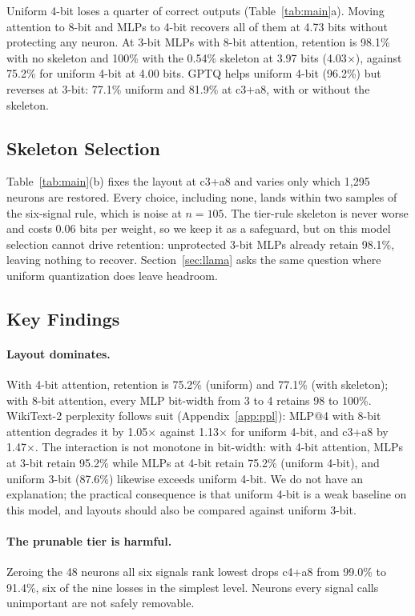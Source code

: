 \documentclass[11pt]{article}
\begin{document}
Uniform 4-bit loses a quarter of correct outputs 
(Table~\ref{tab:main}a). Moving attention to 8-bit and MLPs to 
4-bit recovers all of them at 4.73 bits without protecting any 
neuron. At 3-bit MLPs with 8-bit attention, retention is 98.1\% 
with no skeleton and 100\% with the 0.54\% skeleton at 3.97 
bits (4.03$\times$), against 75.2\% for uniform 4-bit at 4.00 
bits. GPTQ helps uniform 4-bit (96.2\%) but reverses at 3-bit: 
77.1\% uniform and 81.9\% at c3+a8, with or without the 
skeleton.

\subsection{Skeleton Selection}
\label{sec:selection}
Table~\ref{tab:main}(b) fixes the layout at c3+a8 and varies 
only which 1,295 neurons are restored. Every choice, including 
none, lands within two samples of the six-signal rule, which is 
noise at $n{=}105$. The tier-rule skeleton is never worse and 
costs 0.06 bits per weight, so we keep it as a safeguard, but 
on this model selection cannot drive retention: unprotected 
3-bit MLPs already retain 98.1\%, leaving nothing to recover. 
Section~\ref{sec:llama} asks the same question where uniform 
quantization does leave headroom.

\subsection{Key Findings}
\label{sec:findings}

\paragraph{Layout dominates.}
With 4-bit attention, retention is 75.2\% (uniform) and 77.1\% 
(with skeleton); with 8-bit attention, every MLP bit-width from 
3 to 4 retains 98 to 100\%. WikiText-2 perplexity follows suit 
(Appendix~\ref{app:ppl}): MLP@4 with 8-bit attention degrades 
it by 1.05$\times$ against 1.13$\times$ for uniform 4-bit, and 
c3+a8 by 1.47$\times$. The interaction is not monotone in 
bit-width: with 4-bit attention, MLPs at 3-bit retain 95.2\% 
while MLPs at 4-bit retain 75.2\% (uniform 4-bit), and uniform 
3-bit (87.6\%) likewise exceeds uniform 4-bit. We do not have 
an explanation; the practical consequence is that uniform 
4-bit is a weak baseline on this model, and layouts should 
also be compared against uniform 3-bit.

\paragraph{The prunable tier is harmful.}
Zeroing the 48 neurons all six signals rank lowest drops c4+a8 
from 99.0\% to 91.4\%, six of the nine losses in the simplest 
level. Neurons every signal calls unimportant are not safely 
removable.
\end{document}
